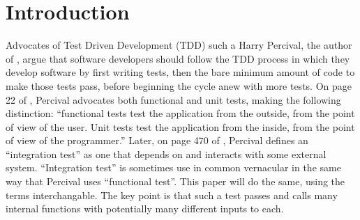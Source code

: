\section{Introduction}\label{sec:introduction}
Advocates of Test Driven Development (TDD)  such a Harry Percival, the 
author of \cite{percival2014test}, argue that software developers should
 follow the TDD process in which they develop software by first writing tests,
then the bare minimum amount of code to make those tests pass,
before beginning the cycle anew with more tests.
%
On page 22 of \cite{percival2014test}, Percival advocates both functional and unit tests, making the following distinction:
“functional tests test the application from the outside, from the point of view
of the user. Unit tests test the application from the inside,
from the point of view of the programmer.”
%
Later, on page 470 of \cite{percival2014test}, Percival defines an “integration test” as
one that depends on and interacts with some external system.
%
“Integration test” is sometimes use in common vernacular in the same way that
Percival uses “functional test”.
%
This paper will do the same, using the terms interchangable.  The key point is
that such a test passes and calls many internal functions with potentially many
 different inputs to each.

